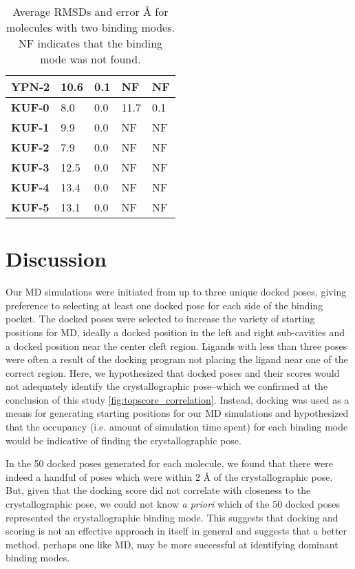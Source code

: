\documentclass[journal=jcisd8,manuscript=article]{achemso}
\begin{document}
\begin{table}[]
\begin{tabular}{|l|l|l|l|l|}
\textbf{YPN-2}  & 10.6          & 0.1              & NF          & NF             \\ \hline
\textbf{KUF-0}  & 8.0           & 0.0              & 11.7        & 0.1            \\ \hline
\textbf{KUF-1}  & 9.9           & 0.0              & NF          & NF             \\ \hline
\textbf{KUF-2}  & 7.9           & 0.0              & NF          & NF             \\ \hline
\textbf{KUF-3}  & 12.5          & 0.0              & NF          & NF             \\ \hline
\textbf{KUF-4}  & 13.4          & 0.0              & NF          & NF             \\ \hline
\textbf{KUF-5}  & 13.1          & 0.0              & NF          & NF             \\ \hline
\end{tabular}
\caption{Average RMSDs and error {\AA} for molecules with two binding modes. NF indicates that the binding mode was not found.}
\label{table:multibm}
\end{table}

\section{Discussion}
Our MD simulations were initiated from up to three unique docked poses, giving preference to selecting at least one docked pose for each side of the binding pocket. 
The docked poses were selected to increase the variety of starting positions for MD, ideally a docked position in the left and right sub-cavities and a docked position near the center cleft region.
Ligands with less than three poses were often a result of the docking program not placing the ligand near one of the correct region. 
Here, we hypothesized that docked poses and their scores would not adequately identify the crystallographic pose--which we confirmed at the conclusion of this study \ref{fig:topscore_correlation}.
Instead, docking was used as a means for generating starting positions for our MD simulations and hypothesized that the occupancy (i.e. amount of simulation time spent) for each binding mode would be indicative of finding the crystallographic pose.

In the 50 docked poses generated for each molecule, we found that there were indeed a handful of poses which were within 2 {\AA} of the crystallographic pose.
But, given that the docking score did not correlate with closeness to the crystallographic pose, we could not know \emph{a priori} which of the 50 docked poses represented the crystallographic binding mode.
This suggests that docking and scoring is not an effective approach in itself in general and suggests that a better method, perhaps one like MD, may be more successful at identifying dominant binding modes.
\end{document}
